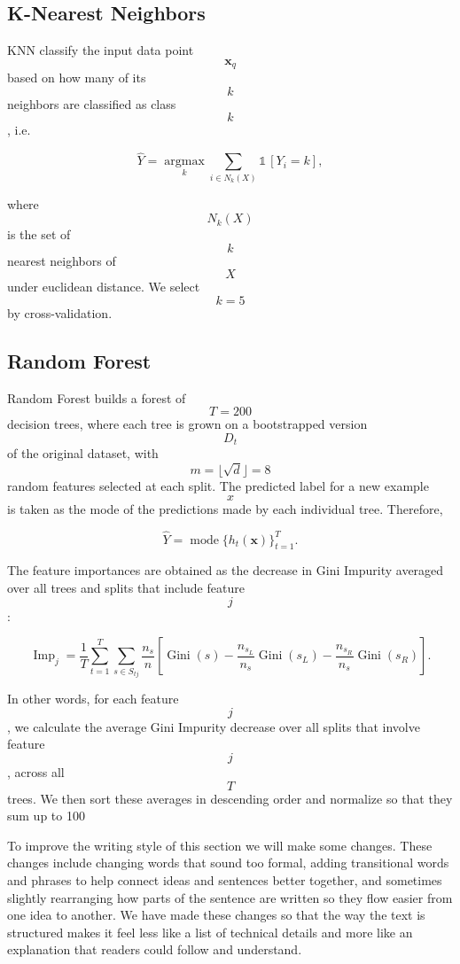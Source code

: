 \subsection{K-Nearest Neighbors }

KNN classify the input data point $$\boldsymbol{x}_q$$ based on how many of its $$k$$ neighbors are classified as class $$k$$, i.e.

$$\hat Y=\underset{k}{\operatorname {arg max }}\displaystyle\sum _{i\in N _k( X )}\mathbb {1}\,[Y_{i}= k],$$

where $$N _k(X)$$ is the set of $$k$$ nearest neighbors of $$X$$ under euclidean distance. We select $$k = 5$$ by cross-validation.

\subsection{Random Forest }

Random Forest builds a forest of $$T = 200$$ decision trees, where each tree is grown on a bootstrapped version $$D_{t}$$ of the original dataset, with $$m = \lfloor \sqrt{d} \rfloor = 8$$ random features selected at each split. The predicted label for a new example $$x$$ is taken as the mode of the predictions made by each individual tree. Therefore,

$$\hat Y = \operatorname {mode}\{ h_{t} (\boldsymbol {x}) \}_{t=1}^{T }.$$

The feature importances are obtained as the decrease in Gini Impurity averaged over all trees and splits that include feature $$j$$:

$$\operatorname {Imp}_{j} = \frac{1}{T} \displaystyle\sum _{t=1}^{T} \displaystyle\sum _{ s\in S_{tj}} \frac{ n_{s}}{ n} [ \operatorname {Gini}( s)- \frac{ n_{s_{L}}} {n_{s}} \operatorname {Gini}( s_{L})-\frac{ n_{s_{R}}} {n_{s}} \operatorname {Gini}( s_{R}) ] .$$

In other words, for each feature $$j$$ , we calculate the average Gini Impurity decrease over all splits that involve feature $$j$$, across all $$T$$ trees. We then sort these averages in descending order and normalize so that they sum up to 100%



To improve the writing style of this section we will make some changes. These changes include changing words that sound too formal, adding transitional words and phrases to help connect ideas and sentences better together, and sometimes slightly rearranging how parts of the sentence are written so they flow easier from one idea to another. We have made these changes so that the way the text is structured makes it feel less like a list of technical details and more like an explanation that readers could follow and understand.

